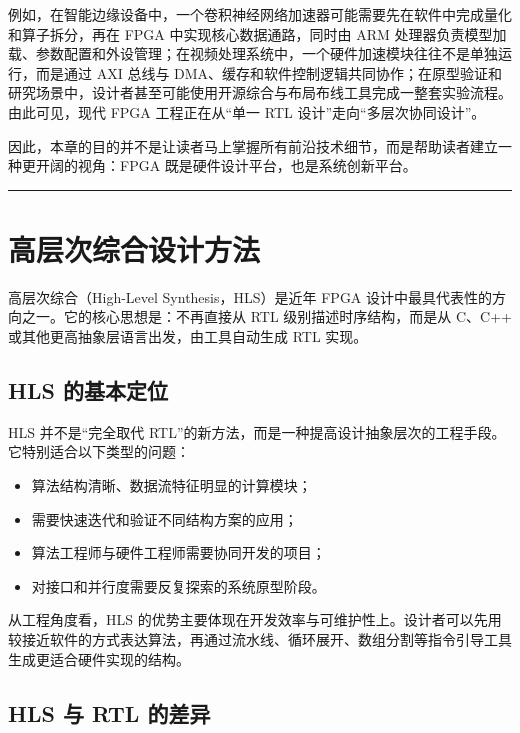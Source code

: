例如，在智能边缘设备中，一个卷积神经网络加速器可能需要先在软件中完成量化和算子拆分，再在
FPGA 中实现核心数据通路，同时由 ARM
处理器负责模型加载、参数配置和外设管理；在视频处理系统中，一个硬件加速模块往往不是单独运行，而是通过
AXI 总线与
DMA、缓存和软件控制逻辑共同协作；在原型验证和研究场景中，设计者甚至可能使用开源综合与布局布线工具完成一整套实验流程。由此可见，现代
FPGA 工程正在从``单一 RTL 设计''走向``多层次协同设计''。

因此，本章的目的并不是让读者马上掌握所有前沿技术细节，而是帮助读者建立一种更开阔的视角：FPGA
既是硬件设计平台，也是系统创新平台。

\begin{center}\rule{0.5\linewidth}{0.5pt}\end{center}

\section{高层次综合设计方法}\label{ux9ad8ux5c42ux6b21ux7efcux5408ux8bbeux8ba1ux65b9ux6cd5}

高层次综合（High-Level Synthesis，HLS）是近年 FPGA
设计中最具代表性的方向之一。它的核心思想是：不再直接从 RTL
级别描述时序结构，而是从 C、C++ 或其他更高抽象层语言出发，由工具自动生成
RTL 实现。

\subsection{HLS 的基本定位}\label{hls-ux7684ux57faux672cux5b9aux4f4d}

HLS 并不是``完全取代
RTL''的新方法，而是一种提高设计抽象层次的工程手段。它特别适合以下类型的问题：

\begin{itemize}
\tightlist
\item
  算法结构清晰、数据流特征明显的计算模块；
\item
  需要快速迭代和验证不同结构方案的应用；
\item
  算法工程师与硬件工程师需要协同开发的项目；
\item
  对接口和并行度需要反复探索的系统原型阶段。
\end{itemize}

从工程角度看，HLS
的优势主要体现在开发效率与可维护性上。设计者可以先用较接近软件的方式表达算法，再通过流水线、循环展开、数组分割等指令引导工具生成更适合硬件实现的结构。

\subsection{HLS 与 RTL 的差异}\label{hls-ux4e0e-rtl-ux7684ux5deeux5f02}

